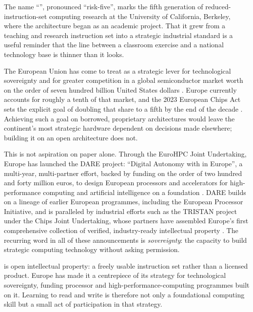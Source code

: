 \begin{prgaside}
The name ``\riscv'', pronounced ``risk-five'', marks the fifth generation of
reduced-instruction-set computing research at the University of California,
Berkeley, where the architecture began as an academic project. That it grew from
a teaching and research instruction set into a strategic industrial standard is a
useful reminder that the line between a classroom exercise and a national
technology base is thinner than it looks.
\end{prgaside}

The European Union has come to treat \riscv as a strategic lever for
technological sovereignty and for greater competition in a global semiconductor
market worth on the order of seven hundred billion United States dollars
\citep{hipeac2026uap}. Europe currently accounts for roughly a tenth of that
market, and the 2023 European Chips Act sets the explicit goal of doubling that
share to a fifth by the end of the decade \citep{hipeac2026uap}. Achieving such a
goal on borrowed, proprietary architectures would leave the continent's most
strategic hardware dependent on decisions made elsewhere; building it on an open
architecture does not.

This is not aspiration on paper alone. Through the EuroHPC Joint Undertaking,
Europe has launched the DARE project: ``Digital Autonomy with \riscv in
Europe'', a multi-year, multi-partner effort, backed by funding on the order of
two hundred and forty million euros, to design European processors and
accelerators for high-performance computing and artificial intelligence on a
\riscv foundation \citep{eurohpcdare,daremedium}. DARE builds on a lineage of
earlier European programmes, including the European Processor Initiative, and is
paralleled by industrial efforts such as the TRISTAN project under the Chips
Joint Undertaking, whose partners have assembled Europe's first comprehensive
collection of verified, industry-ready \riscv intellectual property
\citep{hipeac2026uap}. The recurring word in all of these announcements is
\emph{sovereignty}: the capacity to build strategic computing technology without
asking permission.

\begin{prgconcept}
\riscv is open intellectual property: a freely usable instruction set rather than
a licensed product. Europe has made it a centrepiece of its strategy for
technological sovereignty, funding processor and high-performance-computing
programmes built on it. Learning to read and write \riscv is therefore not only a
foundational computing skill but a small act of participation in that strategy.
\end{prgconcept}

